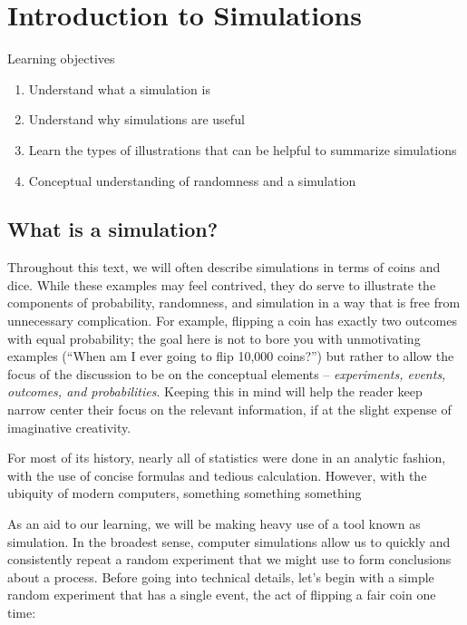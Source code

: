 \documentclass[
]{book}
\providecommand{\tightlist}{%
  \setlength{\itemsep}{0pt}\setlength{\parskip}{0pt}}
\theoremstyle{definition}
\theoremstyle{definition}
\theoremstyle{definition}
\theoremstyle{remark}
\begin{document}
\hypertarget{ch13}{%
\chapter{Introduction to Simulations}\label{ch13}}

Learning objectives

\begin{enumerate}
\def\labelenumi{\arabic{enumi}.}
\tightlist
\item
  Understand what a simulation is
\item
  Understand why simulations are useful
\item
  Learn the types of illustrations that can be helpful to summarize simulations
\item
  Conceptual understanding of randomness and a simulation
\end{enumerate}

\hypertarget{ch13_s1}{%
\section{What is a simulation?}\label{ch13_s1}}

Throughout this text, we will often describe simulations in terms of coins and dice. While these examples may feel contrived, they do serve to illustrate the components of probability, randomness, and simulation in a way that is free from unnecessary complication. For example, flipping a coin has exactly two outcomes with equal probability; the goal here is not to bore you with unmotivating examples (``When am I ever going to flip 10,000 coins?'') but rather to allow the focus of the discussion to be on the conceptual elements -- \emph{experiments, events, outcomes, and probabilities}. Keeping this in mind will help the reader keep narrow center their focus on the relevant information, if at the slight expense of imaginative creativity.

For most of its history, nearly all of statistics were done in an analytic fashion, with the use of concise formulas and tedious calculation. However, with the ubiquity of modern computers, something something something

As an aid to our learning, we will be making heavy use of a tool known as simulation. In the broadest sense, computer simulations allow us to quickly and consistently repeat a random experiment that we might use to form conclusions about a process. Before going into technical details, let's begin with a simple random experiment that has a single event, the act of flipping a fair coin one time:
\end{document}
